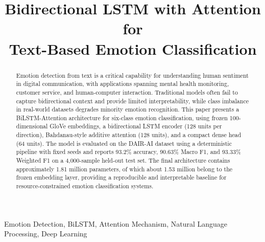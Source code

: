 \documentclass[conference]{IEEEtran}
\begin{document}
\title{Bidirectional LSTM with Attention for\\
Text-Based Emotion Classification}

\author{
}

\maketitle

\begin{abstract}
Emotion detection from text is a critical capability for understanding human sentiment in digital communication, with applications spanning mental health monitoring, customer service, and human-computer interaction. Traditional models often fail to capture bidirectional context and provide limited interpretability, while class imbalance in real-world datasets degrades minority emotion recognition. This paper presents a BiLSTM-Attention architecture for six-class emotion classification, using frozen 100-dimensional GloVe embeddings, a bidirectional LSTM encoder (128 units per direction), Bahdanau-style additive attention (128 units), and a compact dense head (64 units). The model is evaluated on the DAIR-AI dataset using a deterministic pipeline with fixed seeds and reports 93.2\% accuracy, 90.63\% Macro F1, and 93.33\% Weighted F1 on a 4,000-sample held-out test set. The final architecture contains approximately 1.81 million parameters, of which about 1.53 million belong to the frozen embedding layer, providing a reproducible and interpretable baseline for resource-constrained emotion classification systems.

\end{abstract}

\begin{IEEEkeywords}
Emotion Detection, BiLSTM, Attention Mechanism, Natural Language Processing, Deep Learning
\end{IEEEkeywords}
\end{document}
